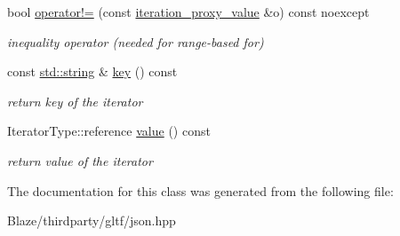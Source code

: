 \begin{DoxyCompactItemize}
\mbox{\label{classnlohmann_1_1detail_1_1iteration__proxy__value_a198d69d182fb6816c9f8ade894975c31}} 
bool \hyperlink{classnlohmann_1_1detail_1_1iteration__proxy__value_a198d69d182fb6816c9f8ade894975c31}{operator!=} (const \hyperlink{classnlohmann_1_1detail_1_1iteration__proxy__value}{iteration\+\_\+proxy\+\_\+value} \&o) const noexcept
\begin{DoxyCompactList}\small\item\em inequality operator (needed for range-\/based for) \end{DoxyCompactList}\item 
\mbox{\label{classnlohmann_1_1detail_1_1iteration__proxy__value_a614278e2eecdf088199fac275ce114b6}} 
const \hyperlink{namespacenlohmann_1_1detail_a1ed8fc6239da25abcaf681d30ace4985ab45cffe084dd3d20d928bee85e7b0f21}{std\+::string} \& \hyperlink{classnlohmann_1_1detail_1_1iteration__proxy__value_a614278e2eecdf088199fac275ce114b6}{key} () const
\begin{DoxyCompactList}\small\item\em return key of the iterator \end{DoxyCompactList}\item 
\mbox{\label{classnlohmann_1_1detail_1_1iteration__proxy__value_ab8e33bd01c285a1a80b737a1905ceb97}} 
Iterator\+Type\+::reference \hyperlink{classnlohmann_1_1detail_1_1iteration__proxy__value_ab8e33bd01c285a1a80b737a1905ceb97}{value} () const
\begin{DoxyCompactList}\small\item\em return value of the iterator \end{DoxyCompactList}\end{DoxyCompactItemize}


The documentation for this class was generated from the following file\+:\begin{DoxyCompactItemize}
\item 
Blaze/thirdparty/gltf/json.\+hpp\end{DoxyCompactItemize}
